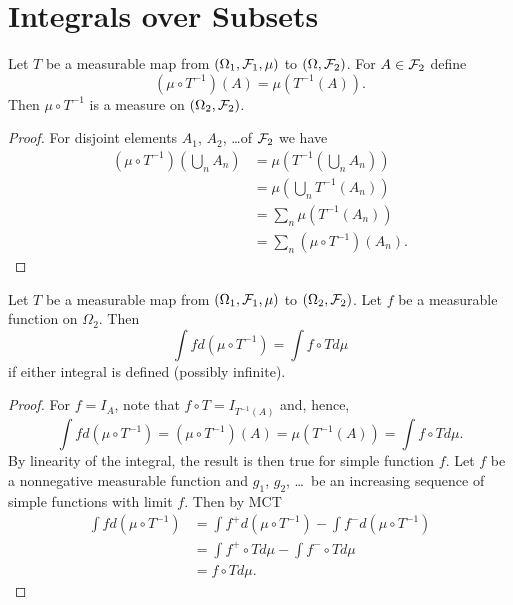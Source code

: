 \chapter{Integrals over Subsets}

\begin{lemma}
Let $T$ be a measurable map from $(\Omega_1, \mathcal F_1, \mu)$ to $(\Omega, \mathcal F_2)$. For $A\in\mathcal F_2$ define
\begin{equation*}
(\mu\circ T^{-1})(A)=\mu(T^{-1}(A)).
\end{equation*}
Then $\mu\circ T^{-1}$ is a measure on $(\Omega_2, \mathcal F_2)$.
\end{lemma}



\begin{proof}
For disjoint elements $A_1$, $A_2$, \ldots of $\mathcal F_2$ we have
\begin{align*}
(\mu\circ T^{-1})\left(\bigcup_n A_n \right) & = \mu\left(T^{-1}\left(\bigcup_n A_n\right)\right)\\
 &= \mu\left(\bigcup_n T^{-1}(A_n) \right)\\
 &= \sum_n \mu(T^{-1}(A_n))\\
 &=\sum_n (\mu\circ T^{-1})(A_n).
\end{align*}
\end{proof}




\begin{theorem}
Let $T$ be a measurable map from $(\Omega_1, \mathcal F_1, \mu)$ to $(\Omega_2, \mathcal F_2)$. Let $f$ be a measurable function on $\Omega_2$. Then
\begin{equation*}
\int fd(\mu\circ T^{-1})=\int f\circ T d\mu
\end{equation*}
if either integral is defined (possibly infinite).
\end{theorem}




\begin{proof}
For $f=I_A$, note that $f\circ T=I_{T^{-1}(A)}$ and, hence, 
\begin{equation*}
\int fd(\mu\circ T^{-1})=(\mu\circ T^{-1})(A)=\mu(T^{-1}(A))=\int f\circ Td\mu.
\end{equation*}
By linearity of the integral, the result is then true for simple function $f$. Let $f$ be a nonnegative measurable function and $g_1$, $g_2$, \ldots\ be an increasing sequence of simple functions with limit $f$. Then by MCT
\begin{align*}
\int fd(\mu\circ T^{-1})&=\int f^+d(\mu\circ T^{-1})-\int f^{-}d(\mu\circ T^{-1})\\
 &=\int f^+\circ Td\mu - \int f^-\circ Td\mu\\
 &=f\circ T d\mu.
\end{align*}
\end{proof}


